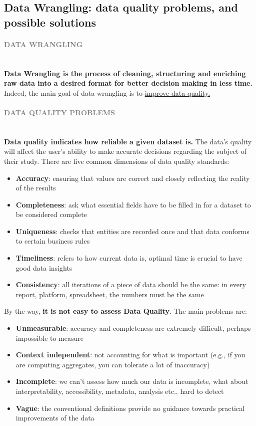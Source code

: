 \documentclass[10pt,a4paper]{article}
\newcommand{\myparagraph}[1]{\paragraph{\normalsize{\textcolor{gray}{\uppercase{\textbf{#1}}}} }\mbox{} \vspace{0.5em}\\}
\begin{document}
\subsection{Data Wrangling: data quality problems, and possible solutions}
\myparagraph{Data Wrangling}
\textbf{Data Wrangling is the process of cleaning, structuring and enriching raw data into a desired format for better decision making in less time.} Indeed, the main goal of data wrangling is to \uline{improve data quality.}
\myparagraph{Data Quality Problems}
\textbf{Data quality indicates how reliable a given dataset is. }The data’s quality will affect the user’s ability to make accurate decisions regarding the subject of their study. There are five common dimensions of data quality standards:
\begin{itemize}
	\item \textbf{Accuracy}: ensuring that values are correct and closely reflecting the reality of the results
	\item \textbf{Completeness}: ask what essential fields have to be filled in for a dataset to be considered complete
	\item \textbf{Uniqueness}: checks that entities are recorded once and that data conforms to certain business rules
	\item \textbf{Timeliness}: refers to how current data is, optimal time is crucial to have good data insights
	\item \textbf{Consistency}: all iterations of a piece of data should be the same: in every report, platform, spreadsheet, the numbers must be the same
\end{itemize}
By the way, \textbf{it is not easy to assess Data Quality}. The main problems are:
\begin{itemize}
	\item \textbf{Unmeasurable}: accuracy and completeness are extremely difficult, perhaps impossible to measure
	\item \textbf{Context independent}: not accounting for what is important (e.g., if you are computing aggregates, you can tolerate a lot of inaccuracy)
	\item \textbf{Incomplete}: we can’t assess how much our data is incomplete, what about interpretability, accessibility, metadata, analysis etc.. hard to detect 
	\item \textbf{Vague}: the conventional definitions provide no guidance towards practical improvements of the data
\end{itemize}
\end{document}
